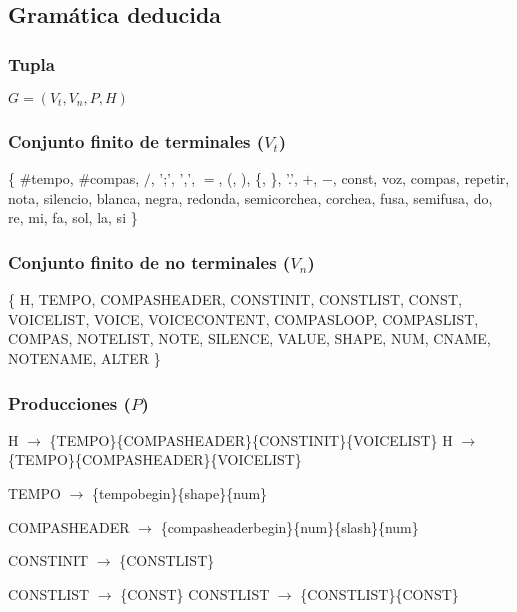 \subsection{Gramática deducida}

\subsubsection{Tupla}

$G = (V_{t}, V_{n}, P, H)$ 

\subsubsection{Conjunto finito de terminales ($V_{t}$)}

\{ \#tempo, \#compas, $/$, ';', ',', $=$, (, ), \{, \}, '.', $+$, $-$, const, voz, compas, repetir, nota, silencio, blanca, negra, redonda, semicorchea, corchea, fusa, semifusa, do, re, mi, fa, sol, la, si \}

\subsubsection{Conjunto finito de no terminales ($V_{n}$)}

\{ H, TEMPO, COMPASHEADER, CONSTINIT, CONSTLIST, CONST, VOICELIST, VOICE, VOICECONTENT, COMPASLOOP, COMPASLIST, COMPAS, NOTELIST, NOTE, SILENCE, VALUE, SHAPE, NUM, CNAME, NOTENAME, ALTER \}

\subsubsection{Producciones ($P$) }


H $\rightarrow$ \{TEMPO\}\{COMPASHEADER\}\{CONSTINIT\}\{VOICELIST\}\newline
H $\rightarrow$ \{TEMPO\}\{COMPASHEADER\}\{VOICELIST\}\newline

TEMPO $\rightarrow$ \{tempobegin\}\{shape\}\{num\}\newline

COMPASHEADER $\rightarrow$ \{compasheaderbegin\}\{num\}\{slash\}\{num\}\newline

CONSTINIT $\rightarrow$ \{CONSTLIST\}\newline

CONSTLIST $\rightarrow$ \{CONST\}\newline
CONSTLIST $\rightarrow$ \{CONSTLIST\}\{CONST\}\newline

